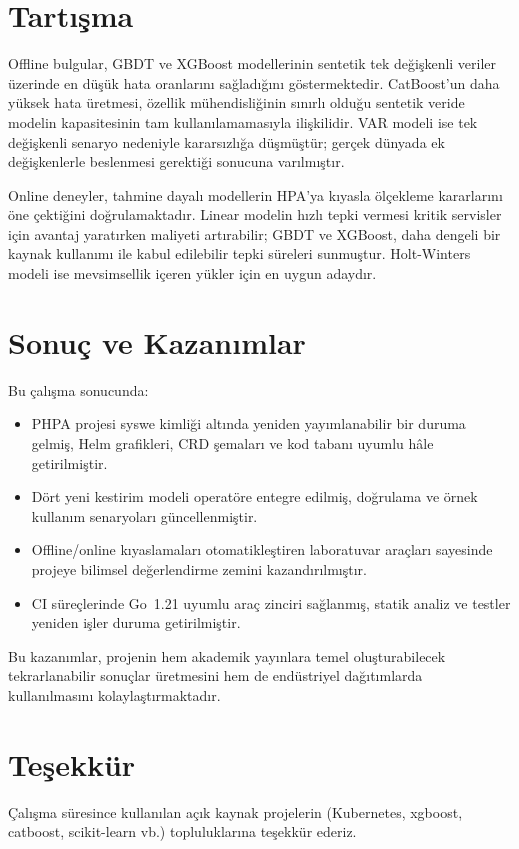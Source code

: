 \documentclass[12pt,a4paper]{article}
\begin{document}
\section{Tartışma}
Offline bulgular, GBDT ve XGBoost modellerinin sentetik tek değişkenli veriler üzerinde en düşük hata oranlarını sağladığını göstermektedir. CatBoost’un daha yüksek hata üretmesi, özellik mühendisliğinin sınırlı olduğu sentetik veride modelin kapasitesinin tam kullanılamamasıyla ilişkilidir. VAR modeli ise tek değişkenli senaryo nedeniyle kararsızlığa düşmüştür; gerçek dünyada ek değişkenlerle beslenmesi gerektiği sonucuna varılmıştır.

Online deneyler, tahmine dayalı modellerin HPA’ya kıyasla ölçekleme kararlarını öne çektiğini doğrulamaktadır. Linear modelin hızlı tepki vermesi kritik servisler için avantaj yaratırken maliyeti artırabilir; GBDT ve XGBoost, daha dengeli bir kaynak kullanımı ile kabul edilebilir tepki süreleri sunmuştur. Holt-Winters modeli ise mevsimsellik içeren yükler için en uygun adaydır.

\section{Sonuç ve Kazanımlar}
Bu çalışma sonucunda:
\begin{itemize}[noitemsep]
  \item PHPA projesi syswe kimliği altında yeniden yayımlanabilir bir duruma gelmiş, Helm grafikleri, CRD şemaları ve kod tabanı uyumlu hâle getirilmiştir.
  \item Dört yeni kestirim modeli operatöre entegre edilmiş, doğrulama ve örnek kullanım senaryoları güncellenmiştir.
  \item Offline/online kıyaslamaları otomatikleştiren laboratuvar araçları sayesinde projeye bilimsel değerlendirme zemini kazandırılmıştır.
  \item CI süreçlerinde Go~1.21 uyumlu araç zinciri sağlanmış, statik analiz ve testler yeniden işler duruma getirilmiştir.
\end{itemize}

Bu kazanımlar, projenin hem akademik yayınlara temel oluşturabilecek tekrarlanabilir sonuçlar üretmesini hem de endüstriyel dağıtımlarda kullanılmasını kolaylaştırmaktadır.

\section*{Teşekkür}
Çalışma süresince kullanılan açık kaynak projelerin (Kubernetes, xgboost, catboost, scikit-learn vb.) topluluklarına teşekkür ederiz.
\end{document}
